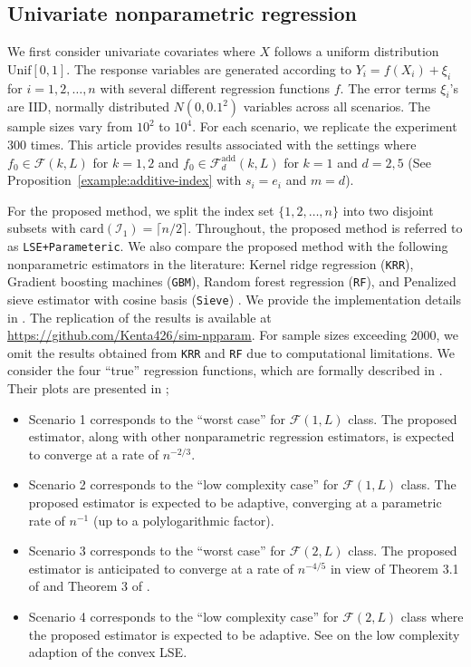 \documentclass[12pt]{article}
\begin{document}
\subsection{Univariate nonparametric regression}\label{sec:univariate-setting}
We first consider univariate covariates where $X$ follows a uniform distribution $\mbox{Unif}[0,1]$. The response variables are generated according to $Y_i = f(X_i) + \xi_i$ for $i = 1, 2,\ldots, n$ with several different regression functions $f$. The error terms $\xi_i$'s are IID, normally distributed $N(0, 0.1^2)$ variables across all scenarios. The sample sizes vary from $10^2$ to $10^4$. For each scenario, we replicate the experiment 300 times. This article provides results associated with the settings where $f_0 \in \mathcal{F}(k, L)$ for $k = 1, 2$ and $f_0 \in \mathcal{F}^{\textrm{add}}_d(k, L)$ for $k=1$ and $d=2, 5$ (See Proposition~\ref{example:additive-index} with $s_i=e_i$ and $m=d$).

For the proposed method, we split the index set $\{1, 2, \dots, n\}$ into two disjoint subsets with $\mathrm{card}(\mathcal{I}_1) = \lceil n/2 \rceil$. Throughout, the proposed method is referred to as \texttt{LSE+Parameteric}. We also compare the proposed method with the following nonparametric estimators in the literature: Kernel ridge regression (\texttt{KRR}), Gradient boosting machines (\texttt{GBM}), Random forest regression (\texttt{RF}), and Penalized sieve estimator with cosine basis (\texttt{Sieve}) \citep{randomforrestPackage, zhang2022regression}. We provide the implementation details in . The replication of the results is available at \url{https://github.com/Kenta426/sim-npparam}. For sample sizes exceeding 2000, we omit the results obtained from \texttt{KRR} and \texttt{RF} due to computational limitations. We consider the four ``true'' regression functions, which are formally described in . Their plots are presented in ;
\begin{itemize}
    \item Scenario 1 corresponds to the ``worst case'' for $\mathcal{F}(1,L)$ class. The proposed estimator, along with other nonparametric regression estimators, is expected to converge at a rate of $n^{-2/3}$. 
    \item Scenario 2 corresponds to the ``low complexity case'' for $\mathcal{F}(1,L)$ class. The proposed estimator is expected to be adaptive, converging at a parametric rate of $n^{-1}$ (up to a polylogarithmic factor). 
    \item Scenario 3 corresponds to the ``worst case'' for $\mathcal{F}(2,L)$ class. The proposed estimator is anticipated to converge at a rate of $n^{-4/5}$ in view of Theorem 3.1 of \cite{kuchibhotla2022least} and Theorem 3 of \cite{han2018robustness}.
    \item Scenario 4 corresponds to the ``low complexity case'' for $\mathcal{F}(2,L)$ class where the proposed estimator is expected to be adaptive. See \cite{guntuboyina2015global, han2018robustness} on the low complexity adaption of the convex LSE. 
\end{itemize}
\end{document}
